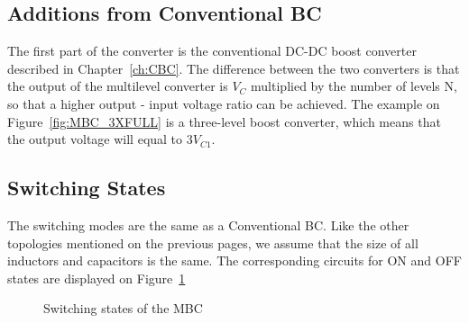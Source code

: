 \subsection{Additions from Conventional BC}
The first part of the converter is the conventional DC-DC boost converter described in Chapter~\ref{ch:CBC}. The difference between the two converters is that the output of the multilevel converter is $V_C$ multiplied by the number of levels N, so that a higher output - input voltage ratio can be achieved. The example on Figure~\ref{fig:MBC_3XFULL} is a three-level boost converter, which means that the output voltage will equal to $3V_{C1}$. 

\subsection{Switching States}
The switching modes are the same as a Conventional BC. Like the other topologies mentioned on the previous pages, we assume that the size of all inductors and capacitors is the same. The corresponding circuits for ON and OFF states are displayed on Figure~\ref{fig:MBC_States}

\begin{figure}[H]%
    \centering
    \qquad
    \caption{Switching states of the MBC}%
     \label{fig:MBC_States}%
\end{figure}


